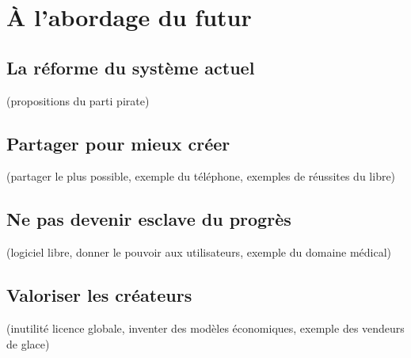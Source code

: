 \chapter{À l'abordage du futur}

\section{La réforme du système actuel}
(propositions du parti pirate)
\section{Partager pour mieux créer}
(partager le plus possible, exemple du téléphone, exemples de réussites du libre)
\section{Ne pas devenir esclave du progrès}
(logiciel libre, donner le pouvoir aux utilisateurs, exemple du domaine médical)
\section{Valoriser les créateurs}
(inutilité licence globale, inventer des modèles économiques, exemple des vendeurs de glace)
